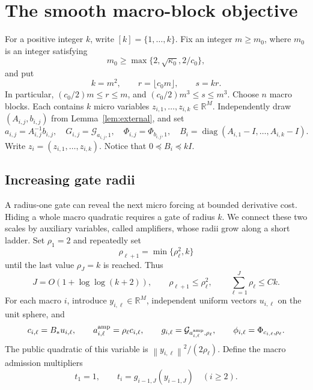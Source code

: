\documentclass[11pt]{article}
\theoremstyle{definition}
\theoremstyle{remark}
\newcommand{\R}{\mathbb R}
\newcommand{\norm}[1]{\left\|#1\right\|}
\newcommand{\diag}{\operatorname{diag}}
\begin{document}
\section{The smooth macro-block objective}\label{sec:construction}
For a positive integer $k$, write $[k]=\{1,\ldots,k\}$.
Fix an integer $m\ge m_0$, where $m_0$ is an integer satisfying
\[
 m_0\ge\max\{2,\sqrt{\kappa_0},2/c_0\},
\]
and put
\[
 k=m^2,\qquad r=\lfloor c_0m\rfloor,\qquad s=kr.
\]
In particular, $(c_0/2)m\le r\le m$, and $(c_0/2)m^3\le s\le m^3$.
Choose $n$ macro blocks. Each contains $k$ micro variables $z_{i,1},\ldots,z_{i,k}\in\R^M$. Independently draw $(A_{i,j},b_{i,j})$ from Lemma~\ref{lem:external}, and set
\[
 a_{i,j}=A_{i,j}^{-1}b_{i,j},\quad
 G_{i,j}=\mathcal G_{a_{i,j},1},\quad
 \Phi_{i,j}=\Phi_{b_{i,j},1},\quad
 B_i=\diag(A_{i,1}-I,\ldots,A_{i,k}-I).
\]
Write $z_i=(z_{i,1},\ldots,z_{i,k})$. Notice that $0\preceq B_i\preceq kI$.

\subsection{Increasing gate radii}
A radius-one gate can reveal the next micro forcing at bounded
derivative cost. Hiding a whole macro quadratic requires a gate of
radius $k$. We connect these two scales by auxiliary variables, called
amplifiers, whose radii grow along a short ladder.
Set $\rho_1=2$ and repeatedly set
\[
 \rho_{\ell+1}=\min\{\rho_\ell^2,k\}
\]
until the last value $\rho_J=k$ is reached. Thus
\begin{equation}\label{eq:ladder}
 J=O(1+\log\log(k+2)),\qquad
 \rho_{\ell+1}\le\rho_\ell^2,\qquad
 \sum_{\ell=1}^J\rho_\ell\le Ck.
\end{equation}
For each macro $i$, introduce $y_{i,\ell}\in\R^M$, independent uniform vectors $u_{i,\ell}$ on the unit sphere, and
\[
 c_{i,\ell}=B_*u_{i,\ell},\qquad
 a^{\rm amp}_{i,\ell}=\rho_\ell c_{i,\ell},\qquad
 g_{i,\ell}=\mathcal G_{a^{\rm amp}_{i,\ell},\rho_\ell},\qquad
 \phi_{i,\ell}=\Phi_{c_{i,\ell},\rho_\ell}.
\]
The public quadratic of this variable is $\norm{y_{i,\ell}}^2/(2\rho_\ell)$.
Define the macro admission multipliers
\[
 t_1=1,\qquad t_i=g_{i-1,J}(y_{i-1,J})\quad (i\ge2).
\]
\end{document}
